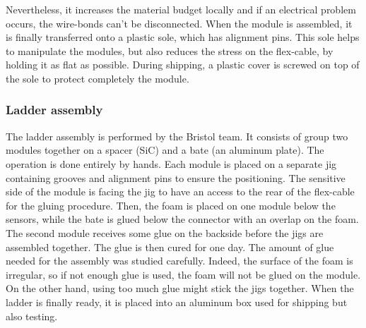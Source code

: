     Nevertheless, it increases the material budget locally and if an electrical problem occurs, the wire-bonds can't be disconnected.
    When the module is assembled, it is finally transferred onto a plastic sole, which has alignment pins.
    This sole helps to manipulate the modules, but also reduces the stress on the flex-cable, by holding it as flat as possible.
    During shipping, a plastic cover is screwed on top of the sole to protect completely the module.



    \subsubsection{Ladder assembly}

    The ladder assembly is performed by the Bristol team.
    It consists of group two modules together on a spacer (\gls{SiC}) and a bate (an aluminum plate).
    The operation is done entirely by hands.
    Each module is placed on a separate jig containing grooves and alignment pins to ensure the positioning.
    The sensitive side of the module is facing the jig to have an access to the rear of the flex-cable for the gluing procedure.
    Then, the foam is placed on one module below the sensors, while the bate is glued below the connector with an overlap on the foam.
    The second module receives some glue on the backside before the jigs are assembled together.
    The glue is then cured for one day.
    The amount of glue needed for the assembly was studied carefully. 
    Indeed, the surface of the foam is irregular, so if not enough glue is used, the foam will not be glued on the module.
    On the other hand, using too much glue might stick the jigs together.
    When the ladder is finally ready, it is placed into an aluminum box used for shipping but also testing.
   
